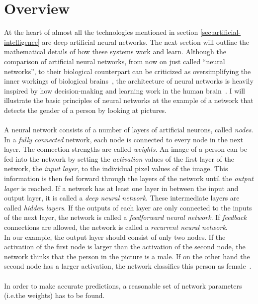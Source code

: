 \section{Overview}
\label{sec:overview}
At the heart of almost all the technologies mentioned in section \ref{sec:artificial-intelligence} are deep artificial neural networks.
The next section will outline the mathematical details of how these systems work and learn.
Although the comparison of artificial neural networks, from now on just called “neural networks”, to their biological counterpart can be criticized as oversimplifying the inner workings of biological brains~\cite[chapter 1.1]{aggarwal_neural_2018}, the architecture of neural networks is heavily inspired by how decision-making and learning work in the human brain~\cite[chapter 1.1]{aggarwal_neural_2018, mit_nnexplained}.
I will illustrate the basic principles of neural networks at the example of a network that detects the gender of a person by looking at pictures.
\\
\\
A neural network consists of a number of layers of artificial neurons, called \textit{nodes}.
In a \textit{fully connected} network, each node is connected to every node in the next layer.
The connection strengths are called \textit{weights}.
An image of a person can be fed into the network by setting the \textit{activation} values of the first layer of the network, the \textit{input layer}, to the individual pixel values of the image.
This information is then fed forward through the layers of the network until the \textit{output layer} is reached.
If a network has at least one layer in between the input and output layer, it is called a \textit{deep neural network}.
These intermediate layers are called \textit{hidden layers}.
If the outputs of each layer are only connected to the inputs of the next layer, the network is called a \textit{feedforward neural network}.
If \textit{feedback} connections are allowed, the network is called a \textit{recurrent neural network}.
\\
In our example, the output layer should consist of only two nodes.
If the activation of the first node is larger than the activation of the second node, the network thinks that the person in the picture is a male.
If on the other hand the second node has a larger activation, the network classifies this person as female~\cite[chapter 1.2]{aggarwal_neural_2018}.
\\
\\
In order to make accurate predictions, a reasonable set of network parameters (i.e.the weights) has to be found.
